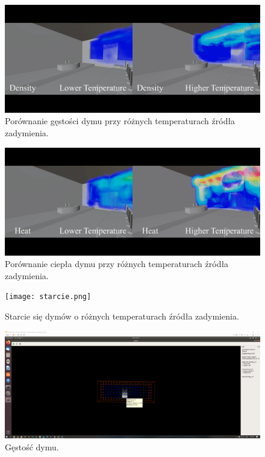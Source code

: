 \documentclass{article}
\begin{document}
        \begin{figure}[ht!]
            \centering
            \includegraphics[scale = 0.15]{3.png}
            \caption{Porównanie gęstości dymu przy różnych temperaturach źródła zadymienia.}
        \end{figure}
        
        
        \begin{figure}[ht!]
            \centering
            \includegraphics[scale = 0.15]{4.png}
            \caption{Porównanie ciepła dymu przy różnych temperaturach źródła zadymienia.}
        \end{figure}
        
        \begin{figure}[ht!]
            \centering
            \texttt{[image: starcie.png]}
            \caption{Starcie się dymów o różnych temperaturach źródła zadymienia.}
        \end{figure}
        
        \begin{figure}[ht!]
            \centering
            \includegraphics[scale = 0.15]{mgui_1.png}
            \caption{Gęstość dymu.}
        \end{figure}
        
\end{document}
